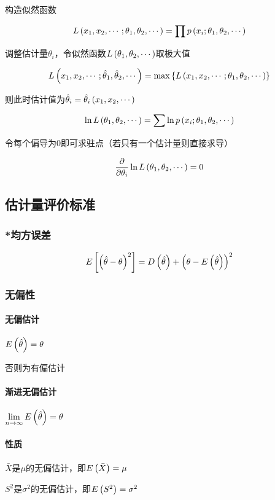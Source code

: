 \documentclass{article}
\begin{document}
构造似然函数

\[L\left(x_1,x_2,\cdots;\theta_1,\theta_2,\cdots\right)=\prod p\left(x_i;\theta_1,\theta_2,\cdots\right)\]

调整估计量$\theta_i$，令似然函数$L\left(\theta_1,\theta_2,\cdots\right)$取极大值

\[L\left(x_1,x_2,\cdots;\hat\theta_1,\hat\theta_2,\cdots\right)=\max\left\{L\left(x_1,x_2,\cdots;\theta_1,\theta_2,\cdots\right)\right\}\]

则此时估计值为$\hat\theta_i=\hat\theta_i\left(x_1,x_2,\cdots\right)$

\[\ln L\left(\theta_1,\theta_2,\cdots\right)=\sum\ln p\left(x_i;\theta_1,\theta_2,\cdots\right)\]

令每个偏导为$0$即可求驻点（若只有一个估计量则直接求导）

\[\frac\partial{\partial\theta_i}\ln L\left(\theta_1,\theta_2,\cdots\right)=0\]

\subsection{估计量评价标准}

\subsubsection{*均方误差}

\[E\left[\left(\hat\theta-\theta\right)^2\right]=D\left(\hat\theta\right)+{\left(\theta-E\left(\hat\theta\right)\right)}^2\]

\subsubsection{无偏性}

\paragraph{无偏估计}$E\left(\hat\theta\right)=\theta$

否则为有偏估计

\paragraph{渐进无偏估计}$\lim\limits_{n\to\infty}E\left(\hat\theta\right)=\theta$

\paragraph{性质}

$\bar X$是$\mu$的无偏估计，即$E\left(\bar X\right)=\mu$

$S^2$是$\sigma^2$的无偏估计，即$E\left(S^2\right)=\sigma^2$
\end{document}
